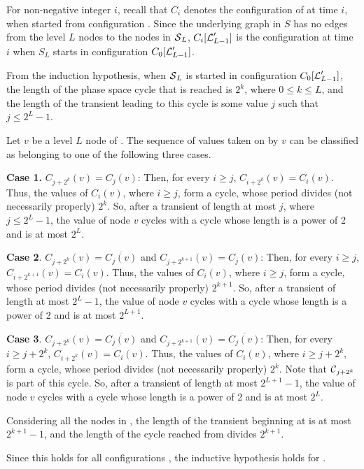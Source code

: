 For non-negative integer $i$, 
recall that $C_i$ denotes the configuration of \cals{} at time $i$, 
when started from configuration \calc{}.
Since the underlying graph in $S$ has 
no edges from the level $L$ nodes to the nodes in $\mbox{$\mathcal{S}$}_L$,
$C_i[\mbox{$\mathcal{L}$}_{L-1}']$ is the configuration at time $i$ 
when $S_L$ starts in configuration $C_0[\mbox{$\mathcal{L}$}_{L-1}']$.

From the induction hypothesis, 
when $\mbox{$\mathcal{S}$}_L$  is started in configuration $C_0[\mbox{$\mathcal{L}$}_{L-1}']$,
the length of the phase space cycle that is reached is $2^k$, where $0 \leq k \leq L$,
and the length of the transient leading to this cycle is some value $j$ such that $j \leq 2^L-1$.

Let $v$ be a level $L$ node of \cals{}.
The sequence of values taken on by $v$ 
can be classified as belonging to one of the following three cases.

{\bf Case 1.} $C_{j+2^k}(v) = C_j(v)$:
Then, for every $i \geq j$, $C_{i+2^k}(v) = C_i(v)$.
Thus, the values of $C_i(v)$, where $i \geq j$, form a cycle, 
whose period divides (not necessarily properly) $2^k$.
So, after a transient of length at most $j$, where $j \leq 2^L-1$,
the value of node $v$ cycles with a cycle whose length is a power of 2 and is at most $2^L$.

{\bf Case 2}. $C_{j+2^k}(v) = \overline{C_j(v)}$ and $C_{j+2^{k+1}}(v) = C_j(v)$:
Then, for every $i \geq j$, $C_{i+2^{k+1}}(v) = C_i(v)$.
Thus, the values of $C_i(v)$, where $i \geq j$, form a cycle, 
whose period divides (not necessarily properly) $2^{k+1}$.
So, after a transient of length at most $2^L-1$,
the value of node $v$ cycles with a cycle whose length is a power of 2 and is at most $2^{L+1}$.

{\bf Case 3}. $C_{j+2^k}(v) = \overline{C_j(v)}$ and $C_{j+2^{k+1}}(v) = \overline{C_j(v)}$:
Then, for every $i \geq j + 2^k$, $C_{i+2^k}(v) = C_i(v)$.
Thus, the values of $C_i(v)$, where $i \geq j + 2^k$, form a cycle, 
whose period divides (not necessarily properly) $2^k$.
Note that  $\mbox{$\mathcal{C}$}_{j+2^k}$ is part of this cycle.
So, after a transient of length at most $2^{L+1}-1$,
the value of node $v$ cycles with a cycle whose length is a power of 2 and is at most $2^L$.


Considering all the nodes in \cals{}, the length of the transient beginning at  \calc{} 
is at most $2^{k+1}-1$, 
and the length of the cycle reached from  \calc{} divides $2^{k+1}$.

Since this holds for all configurations \calc{}, the inductive hypothesis holds for \cals{}.
\QED

